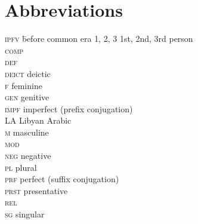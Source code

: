 \documentclass[output=paper]{langsci/langscibook}
\begin{document}
\section*{Abbreviations}
\setlength{\columnsep}{30pt}
\begin{multicols}{2}
\begin{tabbing}
\textsc{ipfv} \hspace{1em} \= before common era\kill
\textsc{1, 2, 3} \> 1st, 2nd, 3rd person \\
\textsc{comp} \>  \\
\textsc{def} \>  \\
\textsc{deict} \> deictic \\
\textsc{f} \> feminine \\
\textsc{gen} \> genitive \\
\textsc{impf} \> imperfect (prefix conjugation) \\
LA \> Libyan Arabic \\
\textsc{m} \> masculine \\
\textsc{mod} \>  \\
\textsc{neg} \> negative \\
\textsc{pl} \> plural \\
\textsc{prf} \> perfect (suffix conjugation) \\
\textsc{prst} \> presentative \\
\textsc{rel} \>  \\
\textsc{sg} \> singular
\end{tabbing}
\end{multicols}


\sloppy
\printbibliography[heading=subbibliography,notkeyword=this]
\end{document}

